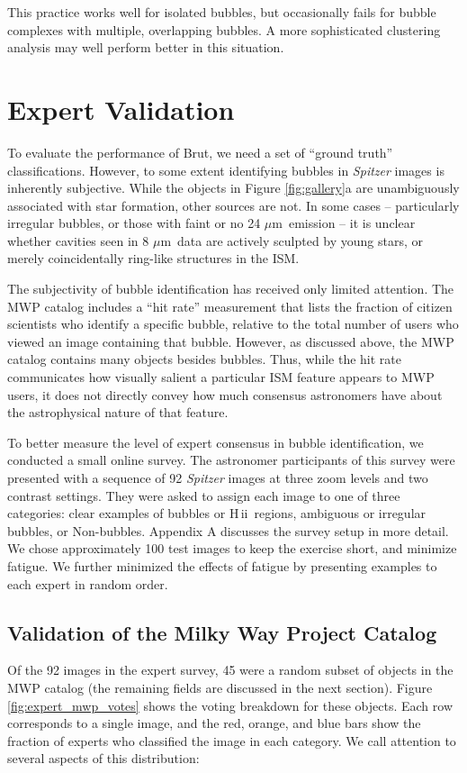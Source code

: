 \documentclass[preprint]{aastex}
\newcommand{\um}[0]{$\mu$m}
\newcommand{\hii}[0]{{\sc H\,ii}}
\begin{document}
This practice works well for isolated bubbles, but occasionally fails for bubble complexes with multiple, overlapping bubbles. A more sophisticated clustering analysis may well perform better in this situation.

\section{Expert Validation}
\label{sec:expert}

To evaluate the performance of Brut, we need a set of ``ground truth'' classifications. However, to some extent identifying bubbles in \textit{Spitzer} images is inherently subjective. While the objects in Figure \ref{fig:gallery}a are unambiguously associated with star formation, other sources are not. In some cases -- particularly irregular bubbles, or those with faint or no 24 \um\, emission -- it is unclear whether cavities seen in 8 \um\, data are actively sculpted by young stars, or merely coincidentally ring-like structures in the ISM.

The subjectivity of bubble identification has received only limited attention. The MWP catalog includes a ``hit rate'' measurement that lists the fraction of citizen scientists who identify a specific bubble, relative to the total number of users who viewed an image containing that bubble. However, as discussed above, the MWP catalog contains many objects besides bubbles. Thus, while the hit rate communicates how visually salient a particular ISM feature appears to MWP users, it does not directly convey how much consensus astronomers have about the astrophysical nature of that feature.

To better measure the level of expert consensus in bubble identification, we conducted a small online survey. The astronomer participants of this survey were presented with a sequence of 92 \emph{Spitzer} images at three zoom levels and two contrast settings. They were asked to assign each image to one of three categories: clear examples of bubbles or \hii\, regions, ambiguous or irregular bubbles, or Non-bubbles. Appendix A discusses the survey setup in more detail. We chose approximately 100 test images to keep the exercise short, and minimize fatigue. We further minimized the effects of fatigue by presenting examples to each expert in random order.

\subsection{Validation of the Milky Way Project Catalog}
\label{sec:expert_mwp}
Of the 92 images in the expert survey, 45 were a random subset of objects in the MWP catalog (the remaining fields are discussed in the next section). Figure \ref{fig:expert_mwp_votes} shows the voting breakdown for these objects. Each row corresponds to a single image, and the red, orange, and blue bars show the fraction of experts who classified the image in each category.  We call attention to several aspects of this distribution: 
\end{document}
